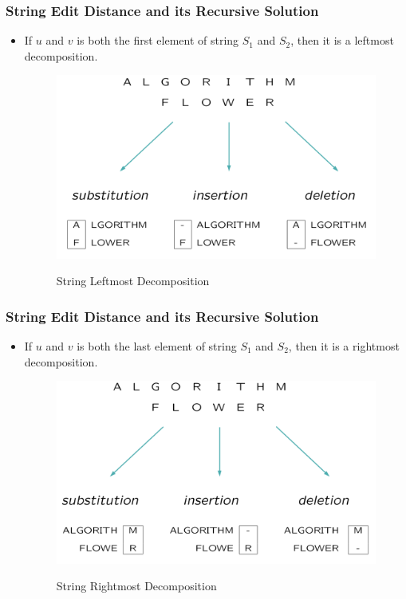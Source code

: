 \documentclass{beamer}
\begin{document}
\begin{frame}
\frametitle{String Edit Distance and its Recursive Solution}
\begin{itemize}
\item If $u$ and $v$ is both the first element of string $S_1$ and $S_2$, then it is a leftmost decomposition.
\begin{figure}
	\includegraphics[width=0.8\linewidth]{StringRecursion1}
	\label{String Leftmost Decomposition} 
	\caption{String Leftmost Decomposition}
	\centering
\end{figure}
\end{itemize}
\end{frame}
\begin{frame}
\frametitle{String Edit Distance and its Recursive Solution}
\begin{itemize}
\item If $u$ and $v$ is both the last element of string $S_1$ and $S_2$, then it is a rightmost decomposition.
\begin{figure}
	\includegraphics[width=0.8\linewidth]{StringRecursion2}
	\label{String Rightmost Decomposition} 
	\caption{String Rightmost Decomposition}
	\centering
\end{figure}
\end{itemize}
\end{frame}
\end{document}
